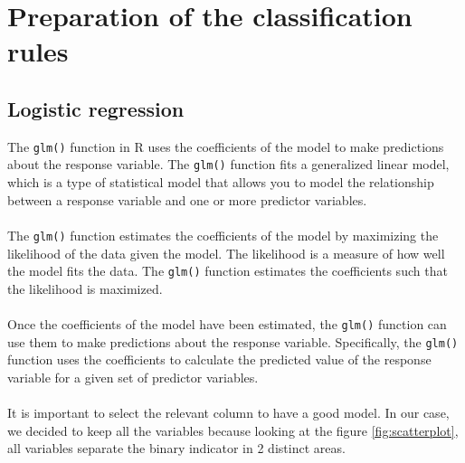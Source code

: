 \section{Preparation of the classification rules}

\subsection{Logistic regression}
The \verb|glm()| function in R uses the coefficients of the model to make predictions about the response variable. The \verb|glm()| function fits a generalized linear model, which is a type of statistical model that allows you to model the relationship between a response variable and one or more predictor variables.
\\\\
The \verb|glm()| function estimates the coefficients of the model by maximizing the likelihood of the data given the model. The likelihood is a measure of how well the model fits the data. The \verb|glm()| function estimates the coefficients such that the likelihood is maximized.
\\\\
Once the coefficients of the model have been estimated, the \verb|glm()| function can use them to make predictions about the response variable. Specifically, the \verb|glm()| function uses the coefficients to calculate the predicted value of the response variable for a given set of predictor variables.
\\\\
It is important to select the relevant column to have a good model. In our case, we decided to keep all the variables because looking at the figure \ref{fig:scatterplot}, all variables separate the binary indicator in 2 distinct areas.

